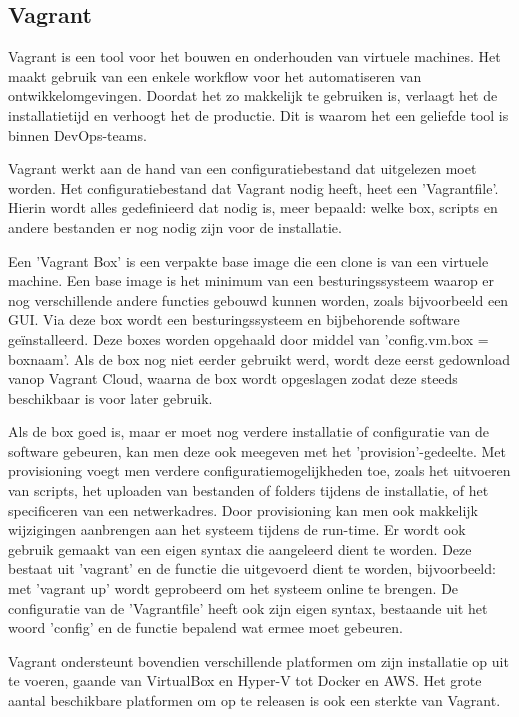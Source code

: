 \autocite{Siron2017}

\subsection{Vagrant}
Vagrant is een tool voor het bouwen en onderhouden van virtuele machines. Het maakt gebruik van een enkele workflow voor het automatiseren van ontwikkelomgevingen. Doordat het zo makkelijk te gebruiken is, verlaagt het de installatietijd en verhoogt het de productie. Dit is waarom het een geliefde tool is binnen DevOps-teams.

Vagrant werkt aan de hand van een configuratiebestand dat uitgelezen moet worden. Het configuratiebestand dat Vagrant nodig heeft, heet een 'Vagrantfile'. Hierin wordt alles gedefinieerd dat nodig is, meer bepaald: welke box, scripts en andere bestanden er nog nodig zijn voor de installatie.

Een 'Vagrant Box' is een verpakte base image die een clone is van een virtuele machine. Een base image is het minimum van een besturingssysteem waarop er nog verschillende andere functies gebouwd kunnen worden, zoals bijvoorbeeld een GUI. Via deze box wordt een besturingssysteem en bijbehorende software geïnstalleerd. Deze boxes worden opgehaald door middel van 'config.vm.box = boxnaam'. Als de box nog niet eerder gebruikt werd, wordt deze eerst gedownload vanop Vagrant Cloud, waarna de box wordt opgeslagen zodat deze steeds beschikbaar is voor later gebruik.

Als de box goed is, maar er moet nog verdere installatie of configuratie van de software gebeuren, kan men deze ook meegeven met het 'provision'-gedeelte. Met provisioning voegt men verdere configuratiemogelijkheden toe, zoals het uitvoeren van scripts, het uploaden van bestanden of folders tijdens de installatie, of het specificeren van een netwerkadres. Door provisioning kan men ook makkelijk wijzigingen aanbrengen aan het systeem tijdens de run-time. Er wordt ook gebruik gemaakt van een eigen syntax die aangeleerd dient te worden. Deze bestaat uit 'vagrant' en de functie die uitgevoerd dient te worden, bijvoorbeeld: met 'vagrant up' wordt geprobeerd om het systeem online te brengen. De configuratie van de 'Vagrantfile' heeft ook zijn eigen syntax, bestaande uit het woord ’config’ en de functie bepalend wat ermee moet gebeuren.

Vagrant ondersteunt bovendien verschillende platformen om zijn installatie op uit te voeren, gaande van VirtualBox en Hyper-V tot Docker en AWS. Het grote aantal beschikbare platformen om op te releasen is ook een sterkte van Vagrant.

